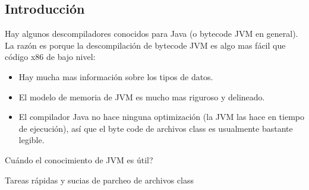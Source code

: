 \subsection{Introducción}

Hay algunos descompiladores conocidos para Java (o bytecode JVM en general).
La razón es porque la descompilación de bytecode JVM es algo mas fácil que código x86 de bajo nivel:

\begin{itemize}
\item Hay mucha mas información sobre los tipos de datos.

\item El modelo de memoria de JVM es mucho mas riguroso y delineado.

\item El compilador Java no hace ninguna optimización (la JVM las hace en tiempo de ejecución), así que el byte
		code de archivos class es usualmente bastante legible.

\end{itemize}

Cuándo el conocimiento de JVM es útil?

\item Tareas rápidas y sucias de parcheo de archivos class

